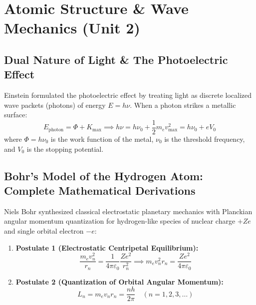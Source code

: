 \documentclass[10pt,a4paper]{article}
\begin{document}
\section{Atomic Structure \& Wave Mechanics (Unit 2)}

\subsection{Dual Nature of Light \& The Photoelectric Effect}
Einstein formulated the photoelectric effect by treating light as discrete localized wave packets (photons) of energy $E = h\nu$. When a photon strikes a metallic surface:
\begin{equation}
  E_{\text{photon}} = \Phi + K_{\max} \implies h\nu = h\nu_0 + \frac{1}{2}m_e v_{\max}^2 = h\nu_0 + e V_0
\end{equation}
where $\Phi = h\nu_0$ is the work function of the metal, $\nu_0$ is the threshold frequency, and $V_0$ is the stopping potential.

\subsection{Bohr's Model of the Hydrogen Atom: Complete Mathematical Derivations}
Niels Bohr synthesized classical electrostatic planetary mechanics with Planckian angular momentum quantization for hydrogen-like species of nuclear charge $+Ze$ and single orbital electron $-e$:
\begin{enumerate}
  \item \textbf{Postulate 1 (Electrostatic Centripetal Equilibrium):}
  \begin{equation}
    \frac{m_e v_n^2}{r_n} = \frac{1}{4\pi\varepsilon_0}\frac{Z e^2}{r_n^2} \implies m_e v_n^2 r_n = \frac{Z e^2}{4\pi\varepsilon_0}
    \label{eq:bohr_force}
  \end{equation}
  \item \textbf{Postulate 2 (Quantization of Orbital Angular Momentum):}
  \begin{equation}
    L_n = m_e v_n r_n = \frac{n h}{2\pi} \quad (n = 1, 2, 3, \dots)
    \label{eq:bohr_quant}
  \end{equation}
\end{enumerate}
\end{document}
